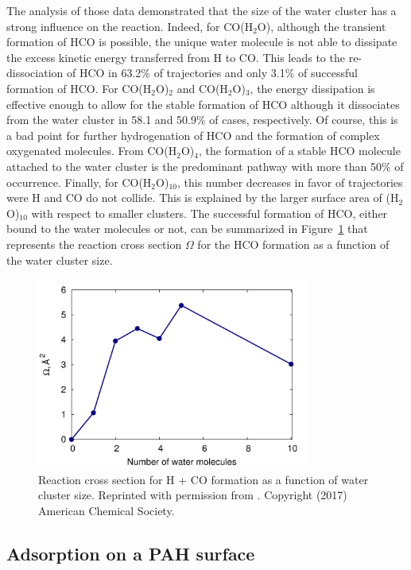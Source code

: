 \documentclass[]{interact}
\theoremstyle{plain}%
\theoremstyle{definition}
\theoremstyle{remark}
\begin{document}
The analysis of those data demonstrated that the size of the water cluster has a strong influence on the reaction.
Indeed, for CO(H$_{2}$O), although the transient formation of HCO is possible, the unique water molecule is not
able to dissipate the excess kinetic energy transferred from H to CO. This leads to the re-dissociation of HCO in 63.2\%
of trajectories and only 3.1\% of successful formation of HCO. For CO(H$_{2}$O)$_{2}$ and CO(H$_{2}$O)$_{3}$, the energy
dissipation is effective enough to allow for the stable formation of HCO although it dissociates from the water cluster in
58.1 and 50.9\% of cases, respectively. Of course, this is a bad point for further hydrogenation of HCO and the formation
of complex oxygenated molecules. From CO(H$_{2}$O)$_{4}$, the formation of a stable HCO molecule attached to the water
cluster is the predominant pathway with more than 50\% of occurrence. Finally, for CO(H$_{2}$O)$_{10}$, this number 
decreases in favor of trajectories were H and CO do not collide. This is explained by the larger surface area of (H$_{2}$O)$_{10}$
with respect to smaller clusters. The successful formation of HCO, either bound to the water molecules or not, can be summarized
in Figure~\ref{recomb} that represents the reaction cross section $\Omega$ for the HCO formation as a function of the water
cluster size.

\begin{figure}
\begin{center}
\includegraphics[width=9cm]{HCO_recomb.png}
\end{center}
\caption{Reaction cross section for H + CO formation as a function of water cluster size.
Reprinted with permission from \cite{Korchagina2017a}. Copyright (2017) American Chemical Society.}
\label{recomb}
\end{figure}

\subsection{Adsorption on a PAH surface} \label{PAHice} 
\end{document}
